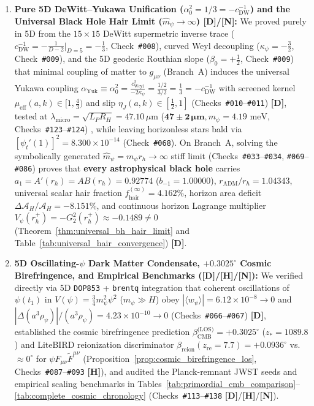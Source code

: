 \documentclass[11pt,a4paper]{article}
\newcommand{\catD}{\textbf{\textcolor{blue!75!black}{[D]}}}
\newcommand{\catH}{\textbf{\textcolor{orange!85!black}{[H]}}}
\newcommand{\catN}{\textbf{\textcolor{teal!75!black}{[N]}}}
\theoremstyle{plain}
\theoremstyle{definition}
\theoremstyle{remark}
\numberwithin{equation}{section}
\begin{document}
\begin{enumerate}
    \item \textbf{Pure 5D DeWitt--Yukawa Unification ($\alpha_0^2 = 1/3 = -c_{\text{DW}}^{-1}$) and the Universal Black Hole Hair Limit ($\hat{m}_{\psi} \to \infty$) \catD/\catN:} We proved purely in 5D from the $15\times 15$ DeWitt supermetric inverse trace ($c_{\text{DW}}^{-1} = -\frac{1}{D-2}\big|_{D=5} = -\frac{1}{3}$, Check~\texttt{\#008}), curved Weyl decoupling ($\kappa_{\psi} = -\frac{3}{2}$, Check~\texttt{\#009}), and the 5D geodesic Routhian slope ($\beta_0 = +\frac{1}{2}$, Check~\texttt{\#009}) that minimal coupling of matter to $g_{\mu\nu}$ (Branch~A) induces the universal Yukawa coupling $\alpha_{\text{Yuk}} \equiv \alpha_0^2 = \frac{c_{\text{Weyl}}^2}{-2\kappa_{\psi}} = \frac{1/2}{3/2} = \frac{1}{3} = -c_{\text{DW}}^{-1}$ with screened kernel $\mu_{\text{eff}}(a,k) \in [1, \frac{4}{3})$ and slip $\eta_J(a,k) \in [\frac{1}{2}, 1]$ (Checks~\texttt{\#010}--\texttt{\#011}) \catD, tested at $\lambda_{\text{micro}} = \sqrt{L_P R_H} = 47.10\,\mu\text{m}$ ($\mathbf{47 \pm 2\,\mu\text{m}}, m_{\psi} = 4.19\text{ meV}$, Checks~\texttt{\#123}--\texttt{\#124}) \cite{lee2020,tan2020_hust}, while leaving horizonless stars bald via $[\psi_t'(1)]^2 = 8.300 \times 10^{-14}$ (Check~\texttt{\#068}). On Branch~A, solving the symbolically generated $\hat{m}_{\psi} = m_{\psi}r_h \to \infty$ stiff limit (Checks~\texttt{\#033}--\texttt{\#034}, \texttt{\#069}--\texttt{\#086}) proves that \textbf{every astrophysical black hole} carries $a_1 = A'(r_h) = AB(r_h) = \mathbf{0.92774}$ ($b_{-1} = \mathbf{1.00000}$), $r_{\text{ADM}}/r_h = \mathbf{1.04343}$, universal scalar hair fraction $f_{\text{hair}}^{(\infty)} = \mathbf{4.162\%}$, horizon area deficit $\Delta\mathcal{A}_H/\mathcal{A}_H = \mathbf{-8.151\%}$, and continuous horizon Lagrange multiplier $V_{\psi}(r_h^+) = -G^2_2(r_h^+) \approx -0.1489 \neq 0$ (Theorem~\ref{thm:universal_bh_hair_limit} and Table~\ref{tab:universal_hair_convergence}) \catD.
    \item \textbf{5D Oscillating-$\psi$ Dark Matter Condensate, $+0.3025^\circ$ Cosmic Birefringence, and Empirical Benchmarks (\catD/\catH/\catN):} We verified directly via 5D \texttt{DOP853} + \texttt{brentq} integration that coherent oscillations of $\psi(t_1)$ in $V(\psi) = \frac{3}{4}m_{\psi}^2\psi^2$ ($m_{\psi} \gg H$) obey $|\langle w_{\psi}\rangle| = 6.12 \times 10^{-8} \to 0$ and $|\Delta(a^3\rho_{\psi})|/(a^3\rho_{\psi}) = 4.23 \times 10^{-10} \to 0$ (Checks~\texttt{\#066}--\texttt{\#067}) \catD, established the cosmic birefringence prediction $\beta_{\text{CMB}}^{\text{(LOS)}} = +0.3025^\circ$ ($z_* = 1089.8$) and LiteBIRD reionization discriminator $\beta_{\text{reion}}(z_{\text{re}} = 7.7) = +0.0936^\circ$ vs.\ $\approx 0^\circ$ for $\psi F_{\mu\nu}\tilde{F}^{\mu\nu}$ (Proposition~\ref{prop:cosmic_birefringence_los}, Checks~\texttt{\#087}--\texttt{\#093} \catH), and audited the Planck-remnant JWST seeds and empirical scaling benchmarks in Tables~\ref{tab:primordial_cmb_comparison}--\ref{tab:complete_cosmic_chronology} (Checks~\texttt{\#113}--\texttt{\#138} \catD/\catH/\catN).
\end{enumerate}
\end{document}
